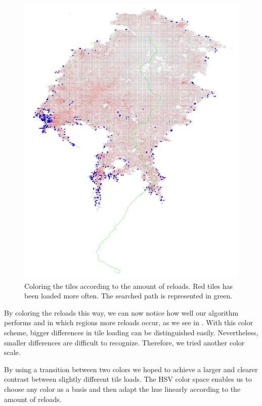 \documentclass
[
    paper = a4,
    pagesize,
    12 pt,
    oneside,                       %
    open = right,
    DIV = calc,
    BCOR = 0 mm,                   %
    bibtotoc
]
{scrbook}
\begin{document}
\begin{figure}
    \includegraphics[width=\textwidth]{Images/vis-rgb-cache.png}
\caption[]{Coloring the tiles according to the amount of reloads. Red tiles has been loaded more often. The searched path is represented in green.}
\label{fig:reload_coloring_white}
\end{figure}

By coloring the reloads this way, we can now notice how well our algorithm performs and in which regions more reloads occur, as we see in .
With this color scheme, bigger differences in tile loading can be distinguished easily.
Nevertheless, smaller differences are difficult to recognize.
Therefore, we tried another color scale.

By using a transition between two colors we hoped to achieve a larger and clearer contrast between slightly different tile loads.
The HSV color space enables us to choose any color as a basis and then adapt the hue linearly according to the amount of reloads.
\end{document}
